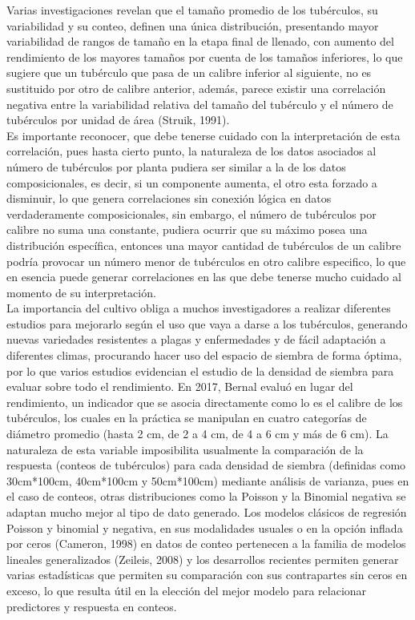 Varias investigaciones revelan que el tamaño promedio de los tubérculos, su variabilidad y su conteo, definen una única distribución, presentando mayor variabilidad de rangos de tamaño en la etapa final de llenado, con aumento del rendimiento de los mayores tamaños por cuenta de los tamaños inferiores, lo que sugiere que un tubérculo que pasa de un calibre inferior al siguiente, no es sustituido por otro de calibre anterior, además, parece existir una correlación negativa entre la variabilidad relativa del tamaño del tubérculo y el número de tubérculos por unidad de área (Struik, 1991).\\

Es importante reconocer, que debe tenerse cuidado con la interpretación de esta correlación, pues hasta cierto punto, la naturaleza de los datos asociados al número de tubérculos por planta pudiera ser similar a la de los datos composicionales, es decir, si un componente aumenta, el otro esta forzado a disminuir, lo que genera correlaciones sin conexión lógica en datos verdaderamente composicionales, sin embargo, el número de tubérculos por calibre no suma una constante, pudiera ocurrir que su máximo posea una distribución específica, entonces una mayor cantidad de tubérculos de un calibre podría provocar un número menor de tubérculos en otro calibre especifico, lo que en esencia puede generar correlaciones en las que debe tenerse mucho cuidado al momento de su interpretación.\\

 La importancia del cultivo obliga a muchos investigadores a realizar diferentes estudios para mejorarlo según el uso que vaya a darse a los tubérculos, generando nuevas variedades resistentes a plagas y enfermedades y de fácil adaptación a diferentes climas, procurando hacer uso del espacio de siembra de forma óptima, por lo que varios estudios evidencian el estudio de la densidad de siembra para evaluar sobre todo el rendimiento. En 2017, Bernal evaluó en lugar del rendimiento, un indicador que se asocia directamente como lo es el calibre de los tubérculos, los cuales en la práctica se manipulan en cuatro categorías de diámetro promedio (hasta 2 cm, de 2 a 4 cm, de 4 a 6 cm y más de 6 cm). La naturaleza de esta variable imposibilita usualmente la comparación de la respuesta (conteos de tubérculos) para cada densidad de siembra (definidas como 30cm*100cm, 40cm*100cm y 50cm*100cm) mediante análisis de varianza, pues en el caso de conteos, otras distribuciones como la Poisson y la Binomial negativa se adaptan mucho mejor al tipo de dato generado. Los modelos clásicos de regresión Poisson y binomial y negativa, en sus modalidades usuales o en la opción inflada por ceros (Cameron, 1998) en datos de conteo pertenecen a la familia de modelos lineales generalizados (Zeileis, 2008) y los desarrollos recientes permiten generar varias estadísticas que permiten su comparación con sus contrapartes sin ceros en exceso, lo que resulta útil en la elección del mejor modelo para relacionar predictores y respuesta en conteos.\\


